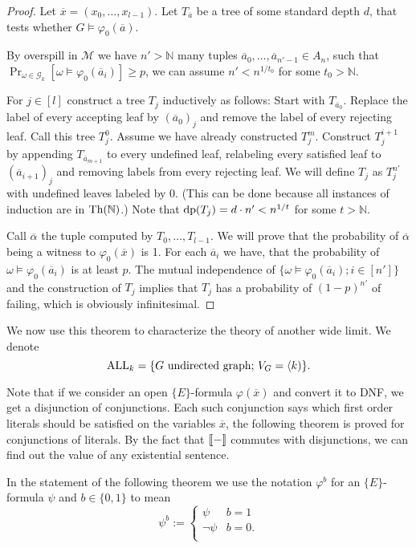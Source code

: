 \begin{proof}
Let $\overline x = (x_0,\dots,x_{l-1})$. Let $T_{\overline a}$ be a tree of some standard depth $d$, that tests whether $G\models\varphi_0(\overline a)$.

By overspill in $\mathcal{M}$ we have $n'>\mathbb{N}$ many tuples \(\overline a_0,\dots,\overline a_{n'-1}\in A_n\), such that \(\Pr_{\omega\in\mathcal{G}_k}[\omega\models\varphi_0(\overline a_i)]\geq p\), we can assume $n'<n^{1/t_0}$ for some $t_0>\mathbb{N}$.


For $j\in[l]$ construct a tree $T_j$ inductively as follows: Start with $T_{\overline a_0}$. Replace the label of every accepting leaf by $(\overline a_0)_j$ and remove the label of every rejecting leaf. Call this tree $T_j^0$. Assume we have already constructed $T_j^{m}$. Construct $T_j^{i+1}$ by appending $T_{\overline a_{m+1}}$ to every undefined leaf, relabeling every satisfied leaf to $(\overline a_{i+1})_j$ and removing labels from every rejecting leaf. We will define $T_j$ as $T_j^{n'}$ with undefined leaves labeled by $0$. (This can be done because all instances of induction are in $\text{Th}(\mathbb{N})$.) Note that $\text{dp}(T_j)=d\cdot n' < n^{1/t}$ for some $t>\mathbb{N}$. 

Call $\overline \alpha$ the tuple computed by $T_0,\dots,T_{l-1}$. We will prove that the probability of $\overline \alpha$ being a witness to $\varphi_0(\overline x)$ is 1. For each $\overline a_i$ we have, that the probability of $\omega\models\varphi_0(\overline a_i)$ is at least $p$. The mutual independence of ${\{\omega\models\varphi_0(\overline a_i);i\in[n']\}}$ and the construction of $T_j$ implies that $T_j$ has a probability of $(1-p)^{n'}$ of failing, which is obviously infinitesimal.
\end{proof}

We now use this theorem to characterize the theory of another wide limit. We denote
\[\text{ALL}_k=\{G \text{ undirected graph; }V_G=\langle k)\}.\]

Note that if we consider an open $\{E\}$-formula $\varphi(\overline x)$ and convert it to DNF, we get a disjunction of conjunctions. Each such conjunction says which first order literals should be satisfied on the variables $\overline x$, the following theorem is proved for conjunctions of literals. By the fact that $[\![-]\!]$ commutes with disjunctions, we can find out the value of any existential sentence.

In the statement of the following theorem we use the notation $\varphi^b$ for an $\{E\}$-formula $\psi$ and $b\in\{0,1\}$ to mean
\[\psi^b:=
\begin{cases}
\psi & b=1\\
\lnot \psi & b=0.\\
\end{cases}
\]

